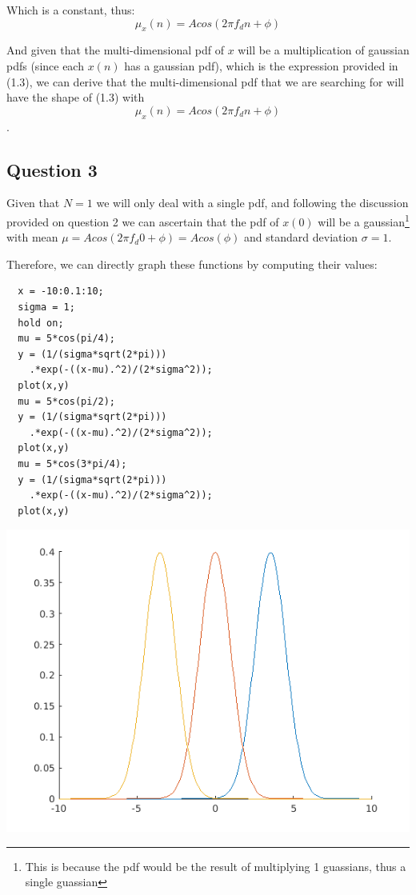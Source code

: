 \documentclass[conference,9pt]{IEEEtran}
\begin{document}
Which is a constant, thus:
$$\mu_x(n)=Acos(2\pi f_dn+\phi)$$

And given that the multi-dimensional pdf of $x$ will be a multiplication of gaussian pdfs (since each $x(n)$ has a gaussian pdf), which is the expression provided in (1.3), we can derive that the multi-dimensional pdf that we are searching for will have the shape of (1.3) with $$\mu_x(n)=Acos(2\pi f_dn+\phi)$$.

\subsection{Question 3}
Given that $N=1$ we will only deal with a single pdf, and following the discussion provided on question 2 we can ascertain that the pdf of $x(0)$ will be a gaussian\footnote{This is because the pdf would be the result of multiplying 1 guassians, thus a single guassian} with mean $\mu = Acos(2\pi f_d 0+\phi)=Acos(\phi)$ and standard deviation $\sigma=1$.

Therefore, we can directly graph these functions by computing their values:

\begin{verbatim}
  x = -10:0.1:10;
  sigma = 1;
  hold on;
  mu = 5*cos(pi/4);
  y = (1/(sigma*sqrt(2*pi)))
    .*exp(-((x-mu).^2)/(2*sigma^2));
  plot(x,y)
  mu = 5*cos(pi/2);
  y = (1/(sigma*sqrt(2*pi)))
    .*exp(-((x-mu).^2)/(2*sigma^2));
  plot(x,y)
  mu = 5*cos(3*pi/4);
  y = (1/(sigma*sqrt(2*pi)))
    .*exp(-((x-mu).^2)/(2*sigma^2));
  plot(x,y)
\end{verbatim}
\includegraphics[scale=0.6]{3}
\end{document}
